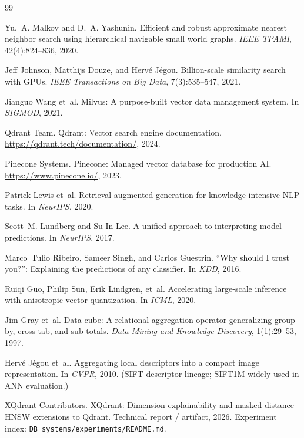 \documentclass[11pt,a4paper]{article}
\begin{document}
\begin{thebibliography}{99}

Yu.~A. Malkov and D.~A. Yashunin.
Efficient and robust approximate nearest neighbor search using hierarchical navigable small world graphs.
\textit{IEEE TPAMI}, 42(4):824--836, 2020.

Jeff Johnson, Matthijs Douze, and Herv{\'e} J{\'e}gou.
Billion-scale similarity search with GPUs.
\textit{IEEE Transactions on Big Data}, 7(3):535--547, 2021.

Jianguo Wang et~al.
Milvus: A purpose-built vector data management system.
In \textit{SIGMOD}, 2021.

Qdrant Team.
Qdrant: Vector search engine documentation.
\url{https://qdrant.tech/documentation/}, 2024.

Pinecone Systems.
Pinecone: Managed vector database for production AI.
\url{https://www.pinecone.io/}, 2023.

Patrick Lewis et~al.
Retrieval-augmented generation for knowledge-intensive NLP tasks.
In \textit{NeurIPS}, 2020.

Scott~M. Lundberg and Su-In Lee.
A unified approach to interpreting model predictions.
In \textit{NeurIPS}, 2017.

Marco~Tulio Ribeiro, Sameer Singh, and Carlos Guestrin.
``Why should I trust you?'': Explaining the predictions of any classifier.
In \textit{KDD}, 2016.

Ruiqi Guo, Philip Sun, Erik Lindgren, et~al.
Accelerating large-scale inference with anisotropic vector quantization.
In \textit{ICML}, 2020.

Jim Gray et~al.
Data cube: A relational aggregation operator generalizing group-by, cross-tab, and sub-totals.
\textit{Data Mining and Knowledge Discovery}, 1(1):29--53, 1997.

Herv{\'e} J{\'e}gou et~al.
Aggregating local descriptors into a compact image representation.
In \textit{CVPR}, 2010.
\newblock (SIFT descriptor lineage; SIFT1M widely used in ANN evaluation.)

XQdrant Contributors.
XQdrant: Dimension explainability and masked-distance HNSW extensions to Qdrant.
Technical report / artifact, 2026.
\newblock Experiment index: \texttt{DB\_systems/experiments/README.md}.

\end{thebibliography}
\end{document}
